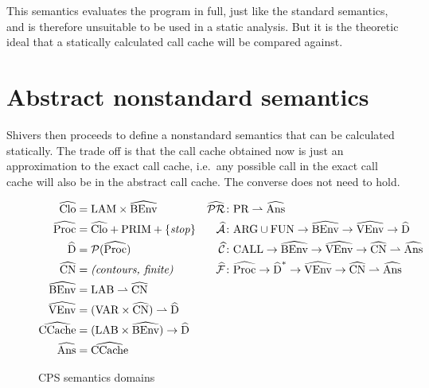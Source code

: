 \documentclass[a4paper,halfparskip,DIV=10,11pt]{scrbook}
\newcommand{\aC}{\widehat{\mathcal C}}
\newcommand{\aF}{\widehat{\mathcal F}}
\newcommand{\aPR}{\widehat{\mathcal {PR}}}
\newcommand{\aA}{\widehat{\mathcal A}}
\begin{document}
This semantics evaluates the program in full, just like the standard semantics, and is therefore unsuitable to be used in a static analysis. But it is the theoretic ideal that a statically calculated call cache will be compared against.

\section{Abstract nonstandard semantics}

Shivers then proceeds to define a nonstandard semantics that can be calculated statically. The trade off is that the call cache obtained now is just an approximation to the exact call cache, i.e.\ any possible call in the exact call cache will also be in the abstract call cache. The converse does not need to hold.

\begin{figure}
\setlength{\FrameSep}{0pt}
\begin{framed}
\begin{align*}
\widehat{\text{Clo}} &= \text{LAM} \times \widehat{\text{BEnv}}
						& \aPR &\colon \text{PR} \rightharpoonup \widehat{\text{Ans}} \\
\widehat{\text{Proc}} &= \widehat{\text{Clo}} + \text{PRIM} + \{\text{\textit{stop}}\} 
						& \aA &\colon \text{ARG}\cup\text{FUN} \to \widehat{\text{BEnv}} \to \widehat{\text{VEnv}} \to \widehat{\text{D}} \\
\widehat{\text{D}} &= \mathcal P(\widehat{\text{Proc}})
						& \aC &\colon \text{CALL}\to \widehat{\text{BEnv}} \to \widehat{\text{VEnv}} \to \widehat{\text{CN}} \rightharpoonup \widehat{\text{Ans}} \\
\widehat{\text{CN}} &= \text{\textit{(contours, finite)}} 
						& \aF &\colon \widehat{\text{Proc}}\to \widehat{\text{D}}^* \to \widehat{\text{VEnv}} \to \widehat{\text{CN}} \rightharpoonup \widehat{\text{Ans}} \\
\widehat{\text{BEnv}} &= \text{LAB} \rightharpoonup \widehat{\text{CN}} \\
\widehat{\text{VEnv}} &= (\text{VAR}\times \widehat{\text{CN}}) \rightharpoonup \widehat{\text{D}} \\
\widehat{\text{CCache}} &= (\text{LAB} \times \widehat{\text{BEnv}}) \to \widehat{\text{D}} \\
\widehat{\text{Ans}} &= \widehat{\text{CCache}}
\end{align*}
\end{framed}
\caption{CPS semantics domains}
\label{fig:abssemdoms}
\end{figure}
\end{document}
